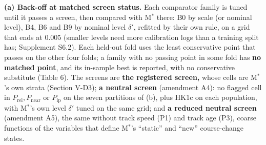 \documentclass{ieeeaccess}
\begin{document}
\textbf{(a) Back-off at matched screen status.} Each comparator family is tuned until it passes a screen, then compared with M$^{*}$ there: B0 by scale (or nominal level), B4, B6 and B9 by nominal level $\delta'$, refitted by their own rule, on a grid that ends at 0.005 (smaller levels need more calibration logs than a training split has; Supplement S6.2). Each held-out fold uses the least conservative point that passes on the other four folds; a family with no passing point in some fold has \textbf{no matched point}, and its in-sample best is reported, with no conservative substitute (Table 6). The screens are \textbf{the registered screen,} whose cells are M$^{*}$'s own strata (Section V-D3); \textbf{a neutral screen} (amendment A4): no flagged cell in $P_{\mathrm{rel}}, P_{\mathrm{near}}$ or $P_{\mathrm{ip}}$ on the seven partitions of (b), plus HK1c on each population, with M$^{*}$'s own level $\delta'$ tuned on the same grid; and \textbf{a reduced neutral screen} (amendment A5), the same without track speed (P1) and track age (P3), coarse functions of the variables that define M$^{*}$'s ``static'' and ``new'' course-change states.
\end{document}
